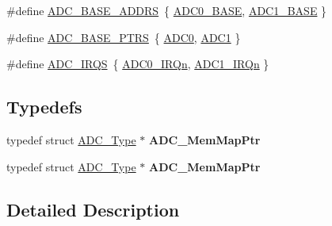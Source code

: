 \begin{DoxyCompactItemize}
\item 
\#define \hyperlink{group__ADC__Peripheral__Access__Layer_gaf635223a5796d02fc2f731139925696d}{A\+D\+C\+\_\+\+B\+A\+S\+E\+\_\+\+A\+D\+D\+RS}~\{ \hyperlink{group__ADC__Peripheral__Access__Layer_ga0aa6c0c068af7a61c770bc6d4322d63e}{A\+D\+C0\+\_\+\+B\+A\+SE}, \hyperlink{group__ADC__Peripheral__Access__Layer_ga695c9a2f892363a1c942405c8d351b91}{A\+D\+C1\+\_\+\+B\+A\+SE} \}
\item 
\#define \hyperlink{group__ADC__Peripheral__Access__Layer_gaaa8175a3a2f4efaceeed5bd26c0b2d3f}{A\+D\+C\+\_\+\+B\+A\+S\+E\+\_\+\+P\+T\+RS}~\{ \hyperlink{group__ADC__Peripheral__Access__Layer_ga0d2ea0f4a8dd17bf08e69d05deacbcb5}{A\+D\+C0}, \hyperlink{group__ADC__Peripheral__Access__Layer_ga90d2d5c526ce5c0a551f533eccbee71a}{A\+D\+C1} \}
\item 
\#define \hyperlink{group__ADC__Peripheral__Access__Layer_ga87c1a48633af604e5c7c6a64383398b9}{A\+D\+C\+\_\+\+I\+R\+QS}~\{ \hyperlink{group__Interrupt__vector__numbers_gga666eb0caeb12ec0e281415592ae89083a08b6c660bfe015ac0842ca95510420eb}{A\+D\+C0\+\_\+\+I\+R\+Qn}, \hyperlink{group__Interrupt__vector__numbers_gga666eb0caeb12ec0e281415592ae89083a34f5005b5e508c84906c6f951f31c1bb}{A\+D\+C1\+\_\+\+I\+R\+Qn} \}
\end{DoxyCompactItemize}
\subsection*{Typedefs}
\begin{DoxyCompactItemize}
\item 
typedef struct \hyperlink{structADC__Type}{A\+D\+C\+\_\+\+Type} $\ast$ {\bfseries A\+D\+C\+\_\+\+Mem\+Map\+Ptr}\hypertarget{group__ADC__Peripheral__Access__Layer_gad14f87345d10ff9d531b7b1235f191e3}{}\label{group__ADC__Peripheral__Access__Layer_gad14f87345d10ff9d531b7b1235f191e3}

\item 
typedef struct \hyperlink{structADC__Type}{A\+D\+C\+\_\+\+Type} $\ast$ {\bfseries A\+D\+C\+\_\+\+Mem\+Map\+Ptr}\hypertarget{group__ADC__Peripheral__Access__Layer_gad14f87345d10ff9d531b7b1235f191e3}{}\label{group__ADC__Peripheral__Access__Layer_gad14f87345d10ff9d531b7b1235f191e3}

\end{DoxyCompactItemize}


\subsection{Detailed Description}


